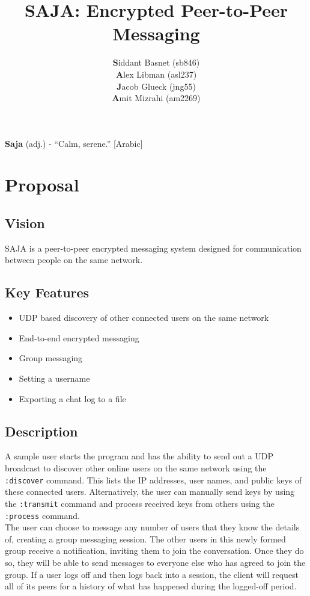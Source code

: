\documentclass{scrartcl}
\title{SAJA: Encrypted Peer-to-Peer Messaging}
\author{\textbf{S}iddant Basnet (sb846) \\ \textbf{A}lex Libman (asl237)\\ \textbf{J}acob Glueck (jng55) \\ \textbf{A}mit Mizrahi (am2269)}
\date{}
\begin{document}
\maketitle

\textbf{Saja} (adj.) - ``Calm, serene.'' [Arabic]

\section{Proposal}
\subsection{Vision}
SAJA is a peer-to-peer encrypted messaging system designed for communication between people on the same network.

\subsection{Key Features}
\begin{itemize}
	\item UDP based discovery of other connected users on the same network
	\item End-to-end encrypted messaging
	\item Group messaging
	\item Setting a username
	\item Exporting a chat log to a file
\end{itemize}

\subsection{Description}
A sample user starts the program and has the ability to send out a UDP broadcast to discover other online users on the same network using the \texttt{:discover} command. This lists the IP addresses, user names, and public keys of these connected users. Alternatively, the user can manually send keys by using the \texttt{:transmit} command and process received keys from others using the \texttt{:process} command.\\

The user can choose to message any number of users that they know the details of, creating a group messaging session. The other users in this newly formed group receive a notification, inviting them to join the conversation. Once they do so, they will be able to send messages to everyone else who has agreed to join the group. If a user logs off and then logs back into a session, the client will request all of its peers for a history of what has happened during the logged-off period.\\
\end{document}
